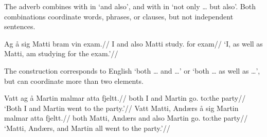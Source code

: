 The adverb  combines with  in  `and also', and with  in  `not only \dots{} but also'. Both combinations coordinate words, phrases, or clauses, but not independent sentences.

\pex
\begingl
\gla Ag å sig Matti bram vin exam.//
\glb I and also Matti study.\Pres{} for exam//
\glft `I, as well as Matti, am studying for the exam.'//
\endgl
\xe

The construction  corresponds to English `both \dots{} and \dots' or `both \dots{} as well as \dots', but can coordinate more than two elements.

\pex
\begingl
\gla Vatt ag å Martin malmar atta fjeltt.//
\glb both I and Martin go.\Pst{} to:the party//
\glft `Both I and Martin went to the party.'//
\endgl
\xe
\pex
\begingl
\gla Vatt Matti, Andærs å sig Martin malmar atta fjeltt.//
\glb both Matti, Andærs and also Martin go.\Pst{} to:the party//
\glft `Matti, Andærs, and Martin all went to the party.'//
\endgl
\xe


